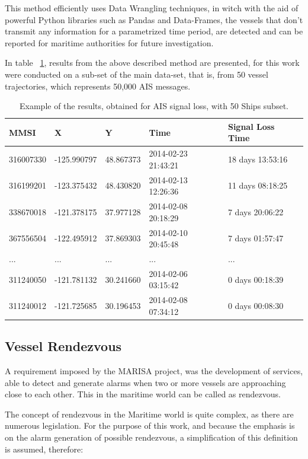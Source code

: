 This method efficiently uses Data Wrangling techniques, in witch with the aid of powerful Python libraries such as Pandas and Data-Frames, the vessels that don't transmit any information for a parametrized time period, are detected and can be reported for maritime authorities for future investigation.

In table ~\ref{Table: AIS signal loss}, results from the above described method are presented, for this work were conducted on a sub-set of the main data-set, that is, from 50 vessel trajectories, which represents 50,000 AIS messages.

\begin{table}[H]
\centering
\caption{Example of the results, obtained for AIS signal loss, with 50 Ships subset.}
\label{Table: AIS signal loss}
\begin{tabular}{@{}lllll@{}}
\toprule
MMSI & X & Y & Time & Signal Loss Time \\ \midrule
316007330 & -125.990797 & 48.867373 & 2014-02-23 21:43:21 & 18 days 13:53:16 \\
316199201 & -123.375432 & 48.430820 & 2014-02-13 12:26:36 & 11 days 08:18:25 \\
338670018 & -121.378175 & 37.977128 & 2014-02-08 20:18:29 & 7 days 20:06:22 \\
367556504 & -122.495912 & 37.869303 & 2014-02-10 20:45:48 & 7 days 01:57:47 \\
... & ... & ... & ... & ... \\
311240050 & -121.781132 & 30.241660 & 2014-02-06 03:15:42 & 0 days 00:18:39 \\
311240012 & -121.725685 & 30.196453 & 2014-02-08 07:34:12 & 0 days 00:08:30 \\ \bottomrule
\end{tabular}
\end{table}

\subsection{Vessel Rendezvous}
A requirement imposed by the MARISA project, was the development of services, able to detect and generate alarms when two or more vessels are approaching close to each other. This in the maritime world can be called as rendezvous.

The concept of rendezvous in the Maritime world is quite complex, as there are numerous legislation. For the purpose of this work, and because the emphasis is on the alarm generation of possible rendezvous, a simplification of this definition is assumed, therefore: 

